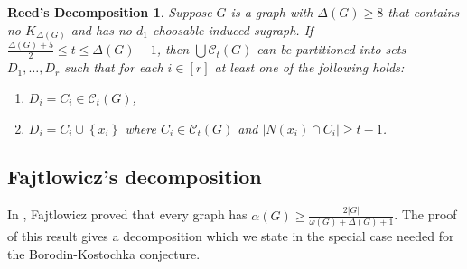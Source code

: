 \documentclass[12pt]{article}
\theoremstyle{plain}
\newtheorem*{ReedDecomp}{Reed's Decomposition}
\theoremstyle{definition}
\theoremstyle{remark}
\newcommand{\fancy}[1]{\mathcal{#1}}
\newcommand{\CC}{\fancy{C}}
\newcommand{\set}[1]{\left\{ #1 \right\}}
\newcommand{\card}[1]{\left|#1\right|}
\newcommand{\irange}[1]{\left[#1\right]}
\begin{document}
\begin{ReedDecomp}
Suppose $G$ is a graph with $\Delta(G) \ge 8$ that contains no $K_{\Delta(G)}$ and has no $d_1$-choosable induced sugraph. If
$\frac{\Delta(G) + 5}{2} \le t \le \Delta(G) - 1$, then $\bigcup \CC_t(G)$ can be
partitioned into sets $D_1, \ldots, D_r$ such that for each $i \in \irange{r}$
at least one of the following holds:
\begin{enumerate}
  \item $D_i = C_i \in \CC_t(G)$,
  \item $D_i = C_i \cup \set{x_i}$ where $C_i \in \CC_t(G)$ and $\card{N(x_i) \cap C_i} \geq t-1$.
\end{enumerate}
\end{ReedDecomp}

\subsection{Fajtlowicz's decomposition}
In \cite{fajtlowicz1984independence}, Fajtlowicz proved that every graph has $\alpha(G) \ge \frac{2\card{G}}{\omega(G) + \Delta(G) + 1}$.  The proof of this result
gives a decomposition which we state in the special case needed for the Borodin-Kostochka conjecture.
\end{document}

